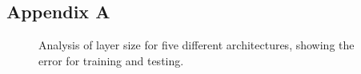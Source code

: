 \documentclass[12pt, a4paper]{article}
\begin{document}
\subsection{Appendix A}\label{AppendixA}
\begin{center}
	\begin{figure}[htbp!]
		\scalebox{.9}{}
		\scalebox{.9}{}
		\scalebox{.9}{}
		\scalebox{.9}{}
		\scalebox{.9}{}
		\caption{Analysis of layer size for five different architectures, showing the error for training and testing.}
		\label{Fig:layer_size}
	\end{figure}
\end{center}
\end{document}
